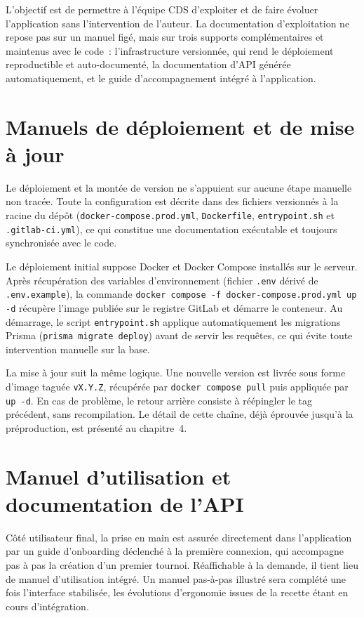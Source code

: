 

L'objectif est de permettre à l'équipe CDS d'exploiter et de faire évoluer l'application sans l'intervention de l'auteur. La documentation d'exploitation ne repose pas sur un manuel figé, mais sur trois supports complémentaires et maintenus avec le code~: l'infrastructure versionnée, qui rend le déploiement reproductible et auto-documenté, la documentation d'API générée automatiquement, et le guide d'accompagnement intégré à l'application.

\section{Manuels de déploiement et de mise à jour}
Le déploiement et la montée de version ne s'appuient sur aucune étape manuelle non tracée. Toute la configuration est décrite dans des fichiers versionnés à la racine du dépôt (\texttt{docker-compose.prod.yml}, \texttt{Dockerfile}, \texttt{entrypoint.sh} et \texttt{.gitlab-ci.yml}), ce qui constitue une documentation exécutable et toujours synchronisée avec le code.

Le déploiement initial suppose Docker et Docker Compose installés sur le serveur. Après récupération des variables d'environnement (fichier \texttt{.env} dérivé de \texttt{.env.example}), la commande \texttt{docker compose -f docker-compose.prod.yml up -d} récupère l'image publiée sur le registre GitLab et démarre le conteneur. Au démarrage, le script \texttt{entrypoint.sh} applique automatiquement les migrations Prisma (\texttt{prisma migrate deploy}) avant de servir les requêtes, ce qui évite toute intervention manuelle sur la base.

La mise à jour suit la même logique. Une nouvelle version est livrée sous forme d'image taguée \texttt{vX.Y.Z}, récupérée par \texttt{docker compose pull} puis appliquée par \texttt{up -d}. En cas de problème, le retour arrière consiste à réépingler le tag précédent, sans recompilation. Le détail de cette chaîne, déjà éprouvée jusqu'à la préproduction, est présenté au chapitre~4.

\section{Manuel d'utilisation et documentation de l'API}\label{sec:doc-api}
Côté utilisateur final, la prise en main est assurée directement dans l'application par un guide d'onboarding déclenché à la première connexion, qui accompagne pas à pas la création d'un premier tournoi. Réaffichable à la demande, il tient lieu de manuel d'utilisation intégré. Un manuel pas-à-pas illustré sera complété une fois l'interface stabilisée, les évolutions d'ergonomie issues de la recette étant en cours d'intégration.

